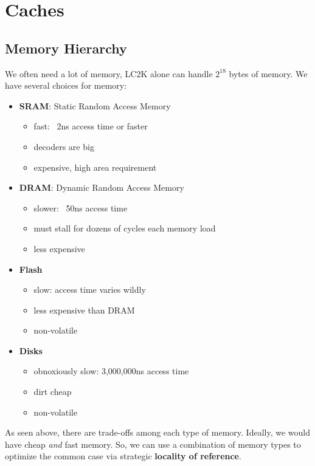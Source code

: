 \setcounter{chapter}{2}
\setcounter{lecture}{16}
\chapter{Caches}
\section{Memory Hierarchy}
We often need a lot of memory, LC2K alone can handle \(2^{18} \) bytes of memory. We have several choices for memory:
\begin{itemize}
	\item \textbf{SRAM}: Static Random Access Memory
		\begin{itemize}
			\item fast: ~2ns access time or faster
			\item decoders are big
			\item expensive, high area requirement
		\end{itemize}
	\item \textbf{DRAM}: Dynamic Random Access Memory
		\begin{itemize}
			\item slower: ~50ns access time
			\item must stall for dozens of cycles each memory load
			\item less expensive
		\end{itemize}
	\item \textbf{Flash}
		\begin{itemize}
			\item slow: access time varies wildly
			\item less expensive than DRAM
			\item non-volatile
		\end{itemize}
	\item \textbf{Disks}
		\begin{itemize}
			\item obnoxiously slow: 3,000,000ns access time
			\item dirt cheap
			\item non-volatile
		\end{itemize}
\end{itemize}

As seen above, there are trade-offs among each type of memory. Ideally, we would have cheap \emph{and} fast memory. So, we can use a combination of memory types to optimize the common case via strategic \textbf{locality of reference}.


